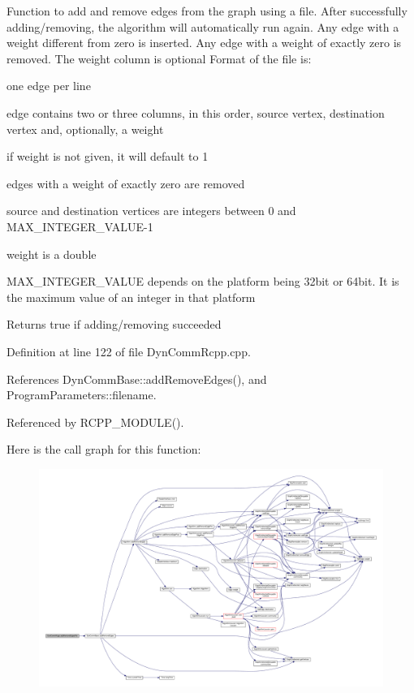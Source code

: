 Function to add and remove edges from the graph using a file. After successfully adding/removing, the algorithm will automatically run again. Any edge with a weight different from zero is inserted. Any edge with a weight of exactly zero is removed. The weight column is optional Format of the file is\+:
\begin{DoxyItemize}
\item one edge per line
\item edge contains two or three columns, in this order, source vertex, destination vertex and, optionally, a weight
\item if weight is not given, it will default to 1
\item edges with a weight of exactly zero are removed
\item source and destination vertices are integers between 0 and M\+A\+X\+\_\+\+I\+N\+T\+E\+G\+E\+R\+\_\+\+V\+A\+L\+U\+E-\/1
\item weight is a double
\item M\+A\+X\+\_\+\+I\+N\+T\+E\+G\+E\+R\+\_\+\+V\+A\+L\+UE depends on the platform being 32bit or 64bit. It is the maximum value of an integer in that platform \begin{DoxyReturn}{Returns}
true if adding/removing succeeded 
\end{DoxyReturn}

\end{DoxyItemize}

Definition at line 122 of file Dyn\+Comm\+Rcpp.\+cpp.



References Dyn\+Comm\+Base\+::add\+Remove\+Edges(), and Program\+Parameters\+::filename.



Referenced by R\+C\+P\+P\+\_\+\+M\+O\+D\+U\+L\+E().

Here is the call graph for this function\+:
\nopagebreak
\begin{figure}[H]
\begin{center}
\leavevmode
\includegraphics[width=350pt]{classDynCommRcpp_a9080af5a73f77db6eff4d7a41596902a_cgraph}
\end{center}
\end{figure}
\mbox{\label{classDynCommRcpp_ae9fb6b69740abb2d52721ec76d744811}} 
